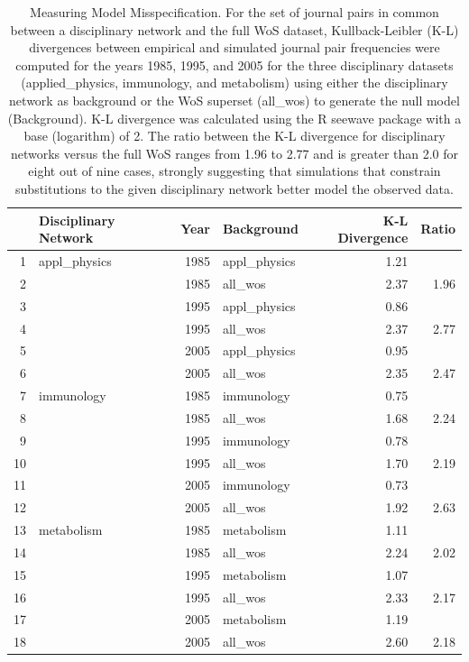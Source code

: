 \documentclass[NETN]{stjour}
\begin{document}
\begin{table}[ht]
\caption{Measuring Model Misspecification. For the set of journal pairs in common between a disciplinary network and the full WoS dataset, Kullback-Leibler (K-L) divergences
between empirical and simulated journal pair frequencies were computed for the years 1985, 1995, and 2005 for the three disciplinary datasets (applied\_physics, immunology, and metabolism) using either the disciplinary network as background or the WoS superset (all\_wos) to generate the null model (Background). K-L divergence was calculated using the R seewave package with a base (logarithm) of 2. The ratio between the K-L divergence for disciplinary networks versus the full WoS ranges from 1.96 to 2.77 and is greater than 2.0 for eight out of nine cases, strongly suggesting that simulations that constrain substitutions to the given disciplinary network better model the observed data.}
\label{tab:label}
\centering
\begin{tabular}{|r lrlr r|}
  \hline
 & Disciplinary Network & Year & Background & K-L Divergence & Ratio \\ 
  \hline
1 & appl\_physics & 1985 & appl\_physics & 1.21 &  \\ 
  2 &  & 1985 & all\_wos & 2.37 & 1.96 \\ 
  3 &  & 1995 & appl\_physics & 0.86 &  \\ 
  4 &  & 1995 & all\_wos & 2.37 & 2.77 \\ 
  5 &  & 2005 & appl\_physics & 0.95 &  \\ 
  6 &  & 2005 & all\_wos & 2.35 & 2.47 \\ 
    \hline
  7 & immunology & 1985 & immunology & 0.75 &  \\ 
  8 &  & 1985 & all\_wos & 1.68 & 2.24 \\ 
  9 &  & 1995 & immunology & 0.78 &  \\ 
  10 &  & 1995 & all\_wos & 1.70 & 2.19 \\ 
  11 &  & 2005 & immunology & 0.73 &  \\ 
  12 &  & 2005 & all\_wos & 1.92 & 2.63 \\ 
    \hline
  13 & metabolism & 1985 & metabolism & 1.11 &  \\ 
  14 &  & 1985 & all\_wos & 2.24 & 2.02 \\ 
  15 &  & 1995 & metabolism & 1.07 &  \\ 
  16 &  & 1995 & all\_wos & 2.33 & 2.17 \\ 
  17 &  & 2005 & metabolism & 1.19 &  \\ 
  18 &  & 2005 & all\_wos & 2.60 & 2.18 \\ 
   \hline
\end{tabular}
\end{table}
\end{document}
